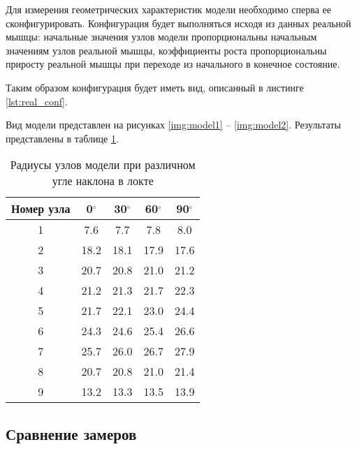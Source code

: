 Для измерения геометрических характеристик модели необходимо сперва ее сконфигурировать. Конфигурация будет выполняться исходя из данных реальной мышцы: начальные значения узлов модели пропорциональны начальным значениям узлов реальной мышцы, коэффициенты роста пропорциональны приросту реальной мышцы при переходе из начального в конечное состояние.

Таким образом конфигурация будет иметь вид, описанный в листинге \ref{lst:real_conf}.



Вид модели представлен на рисунках \ref{img:model1} -- \ref{img:model2}. Результаты представлены в таблице \ref{tab:model}. 


\begin{table}[!h]
    \begin{center}
        \begin{tabular}{|c|c|c|c|c|}
            \hline
            Номер узла & 0$^\circ$ & 30$^\circ$ & 60$^\circ$ & 90$^\circ$ \\
            \hline
            \hline
            1 & 7.6 &   7.7 &  7.8 &  8.0 \\
            \hline
            2 & 18.2 & 18.1 & 17.9 & 17.6 \\
            \hline
            3 & 20.7 & 20.8 & 21.0 & 21.2 \\
            \hline
            4 & 21.2 & 21.3 & 21.7 & 22.3 \\
            \hline
            5 & 21.7 & 22.1 & 23.0 & 24.4 \\
            \hline
            6 & 24.3 & 24.6 & 25.4 & 26.6 \\
            \hline
            7 & 25.7 & 26.0 & 26.7 & 27.9 \\
            \hline
            8 & 20.7 & 20.8 & 21.0 & 21.4 \\
            \hline
            9 & 13.2 & 13.3 & 13.5 & 13.9 \\
            \hline
        \end{tabular}
    \end{center}
    \caption{\label{tab:model} Радиусы узлов модели при различном угле наклона в локте}
\end{table}

\subsection{Сравнение замеров}

